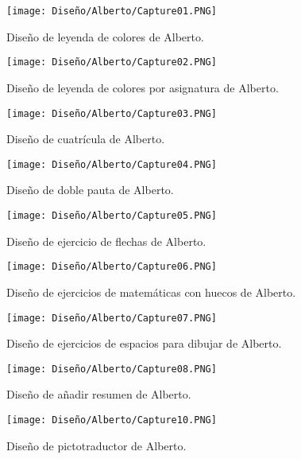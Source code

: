 \begin{figure}[ht!]
  \centering
\texttt{[image: Diseño/Alberto/Capture01.PNG]}
  \caption{Diseño de leyenda de colores de Alberto.}
  
  
\end{figure}

\begin{figure}[ht!]
  \centering
\texttt{[image: Diseño/Alberto/Capture02.PNG]}
  \caption{Diseño de leyenda de colores por asignatura de Alberto.}
  
  
\end{figure}
\begin{figure}[ht!]
  \centering
\texttt{[image: Diseño/Alberto/Capture03.PNG]}
  \caption{Diseño de cuatrícula de Alberto.}
  
  
\end{figure}
\begin{figure}[ht!]
  \centering
\texttt{[image: Diseño/Alberto/Capture04.PNG]}
  \caption{Diseño de doble pauta de Alberto.}
  
  
\end{figure}
\begin{figure}[ht!]
  \centering
\texttt{[image: Diseño/Alberto/Capture05.PNG]}
  \caption{Diseño de ejercicio de flechas de Alberto.}
  
  
\end{figure}
\begin{figure}[ht!]
  \centering
\texttt{[image: Diseño/Alberto/Capture06.PNG]}
  \caption{Diseño de ejercicios de matemáticas con huecos de Alberto.}
  
  
\end{figure}
\begin{figure}[ht!]
  \centering
\texttt{[image: Diseño/Alberto/Capture07.PNG]}
  \caption{Diseño de ejercicios de espacios para dibujar de Alberto.}
  
 
\end{figure}
\begin{figure}[ht!]
  \centering
\texttt{[image: Diseño/Alberto/Capture08.PNG]}
  \caption{Diseño de añadir resumen de Alberto.}
  
  
  
  
\end{figure}
\begin{figure}[ht!]
  \centering
\texttt{[image: Diseño/Alberto/Capture10.PNG]}
  \caption{Diseño de pictotraductor de Alberto.}
  
  
  
\end{figure}
